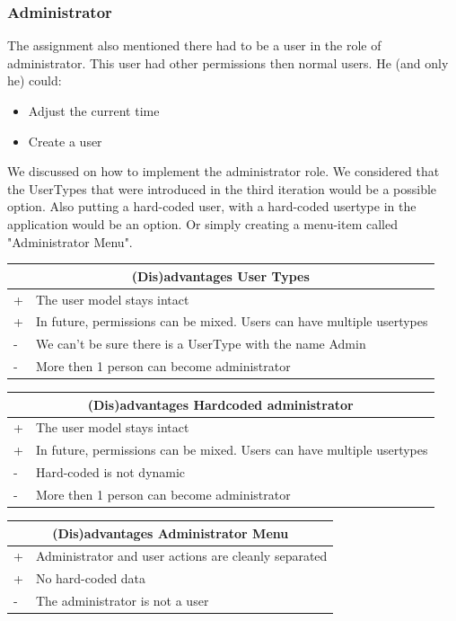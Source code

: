 			\subsubsection{Administrator}
			The assignment also mentioned there had to be a user in the role of administrator. This user had other permissions then normal users. He (and only he) could:
			\begin{itemize}
				\item{Adjust the current time}
				\item{Create a user}
			\end{itemize}
			
			We discussed on how to implement the administrator role. We considered that the UserTypes that were introduced in the third iteration would be a possible option. Also putting a hard-coded user, with a hard-coded usertype in the application would be an option. Or simply creating a menu-item called "Administrator Menu".\\
			\begin{tabular}{|l|l|}
				\hline
				\multicolumn{2}{|c|}{(Dis)advantages User Types} \\
				\hline
				+ & The user model stays intact\\
				+ & In future, permissions can be mixed. Users can have multiple usertypes\\
				\hline
				- & We can't be sure there is a UserType with the name Admin\\
				- & More then 1 person can become administrator\\
				\hline
			\end{tabular}
			
			\begin{tabular}{|l|l|}
				\hline
				\multicolumn{2}{|c|}{(Dis)advantages Hardcoded administrator} \\
				\hline
				+ & The user model stays intact\\
				+ & In future, permissions can be mixed. Users can have multiple usertypes\\
				\hline
				- & Hard-coded is not dynamic\\
				- & More then 1 person can become administrator\\
				\hline
			\end{tabular}
			
			\begin{tabular}{|l|l|}
				\hline
				\multicolumn{2}{|c|}{(Dis)advantages Administrator Menu} \\
				\hline
				+ & Administrator and user actions are cleanly separated\\
				+ & No hard-coded data\\
				\hline
				- & The administrator is not a user\\
				\hline
			\end{tabular}
			

